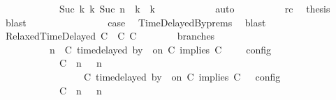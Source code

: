 \begin{isabellebody}
\ \ \ \ \ \ \ \ \ \ \ \ {\isasymhookrightarrow}\isactrlbsup Suc\ k\isactrlesup \ {\isacharparenleft}{\isasymGamma}\isactrlsub k{\isacharcomma}\ Suc\ n\ {\isasymturnstile}\ {\isasymPsi}\isactrlsub k\ {\isasymtriangleright}\ {\isasymPhi}\isactrlsub k{\isacharparenright}{\isacartoucheclose}\isanewline
\ \ \ \ \ \ \ \ \ \ \isamarkupfalse%
\ auto\isanewline
\ \ \ \ \ \ \ \ \isamarkupfalse%
\ rc\ \isamarkupfalse%
\ {\isacharquery}thesis\ \isamarkupfalse%
\ blast\isanewline
\ \ \ \ \ \ \isamarkupfalse%
\isanewline
\ \ \ \ \ \ \isamarkupfalse%
\ \isamarkupfalse%
\ {\isacharquery}case\ \isamarkupfalse%
\ TimeDelayedBy{\isachardot}prems{\isacharparenleft}{}{\isacharparenright}\ \isamarkupfalse%
\ blast\isanewline
\ \ \isamarkupfalse%
\isanewline
\ \ \ \ \isamarkupfalse%
\ {\isacharparenleft}RelaxedTimeDelayed\ C\ {\isasymdelta}{\isasymtau}\ C\ C\isanewline
\ \ \ \ \ \ \isamarkupfalse%
\ branches{\isacharcolon}\isanewline
\ \ \ \ \ \ \ \ {\isacartoucheopen}{\isasymlbrakk}\ {\isasymGamma}{\isacharcomma}\ n\ {\isasymturnstile}\ {\isacharparenleft}{\isacharparenleft}C\ time{\isacharminus}delayed{\isasymbowtie}\ by\ {\isasymdelta}{\isasymtau}\ on\ C\ implies\ C\ {\isacharhash}\ {\isasymPsi}{\isacharparenright}\ {\isasymtriangleright}\ {\isasymPhi}\ {\isasymrbrakk}\isactrlsub c\isactrlsub o\isactrlsub n\isactrlsub f\isactrlsub i\isactrlsub g\isanewline
\ \ \ \ \ \ \ \ \ \ {\isacharequal}\ {\isasymlbrakk}\ {\isacharparenleft}{\isacharparenleft}C\ {\isasymnot}{\isasymUp}\ n{\isacharparenright}\ {\isacharhash}\ {\isasymGamma}{\isacharparenright}{\isacharcomma}\ n\isanewline
\ \ \ \ \ \ \ \ \ \ \ \ \ \ {\isasymturnstile}\ {\isasymPsi}\ {\isasymtriangleright}\ {\isacharparenleft}{\isacharparenleft}C\ time{\isacharminus}delayed{\isasymbowtie}\ by\ {\isasymdelta}{\isasymtau}\ on\ C\ implies\ C\ {\isacharhash}\ {\isasymPhi}{\isacharparenright}\ {\isasymrbrakk}\isactrlsub c\isactrlsub o\isactrlsub n\isactrlsub f\isactrlsub i\isactrlsub g\isanewline
\ \ \ \ \ \ \ \ \ \ {\isasymunion}\ {\isasymlbrakk}\ {\isacharparenleft}{\isacharparenleft}C\ {\isasymUp}\ n{\isacharparenright}\ {\isacharhash}\ {\isasymGamma}{\isacharparenright}{\isacharcomma}\ n\isanewline

\end{isabellebody}
